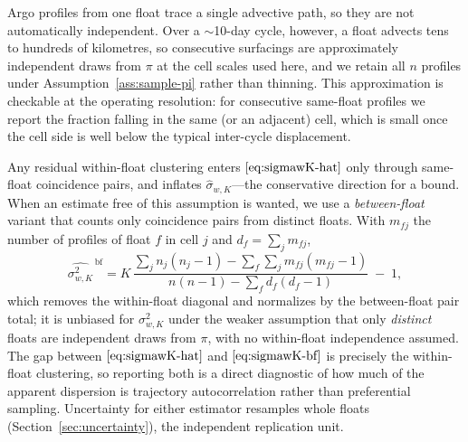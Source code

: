 \begin{remark}
\label{rem:trajectory}
Argo profiles from one float trace a single advective path, so they are
not automatically independent. Over a $\sim$10-day cycle, however, a
float advects tens to hundreds of kilometres, so consecutive surfacings
are approximately independent draws from $\pi$ at the cell scales used
here, and we retain all $n$ profiles under Assumption~\ref{ass:sample-pi}
rather than thinning. This approximation is checkable at the operating
resolution: for consecutive same-float profiles we report the fraction
falling in the same (or an adjacent) cell, which is small once the cell
side is well below the typical inter-cycle displacement.

Any residual within-float clustering enters $\eqref{eq:sigmawK-hat}$
only through same-float coincidence pairs, and inflates
$\hat\sigma_{w,K}$---the conservative direction for a bound. When an
estimate free of this assumption is wanted, we use a
\emph{between-float} variant that counts only coincidence pairs from
distinct floats. With $m_{fj}$ the number of profiles of float $f$ in
cell $j$ and $d_f=\sum_j m_{fj}$,
\begin{equation}
  \widehat{\sigma_{w,K}^2}^{\,\mathrm{bf}}
  = K\,\frac{\sum_j n_j(n_j-1)-\sum_f\sum_j m_{fj}(m_{fj}-1)}
             {n(n-1)-\sum_f d_f(d_f-1)}\;-\;1 ,
  \label{eq:sigmawK-bf}
\end{equation}
which removes the within-float diagonal and normalizes by the
between-float pair total; it is unbiased for $\sigma_{w,K}^2$ under the
weaker assumption that only \emph{distinct} floats are independent draws
from $\pi$, with no within-float independence assumed. The gap between
$\eqref{eq:sigmawK-hat}$ and $\eqref{eq:sigmawK-bf}$ is precisely the
within-float clustering, so reporting both is a direct diagnostic of how
much of the apparent dispersion is trajectory autocorrelation rather
than preferential sampling. Uncertainty for either estimator resamples
whole floats (Section~\ref{sec:uncertainty}), the independent
replication unit.
\end{remark}

